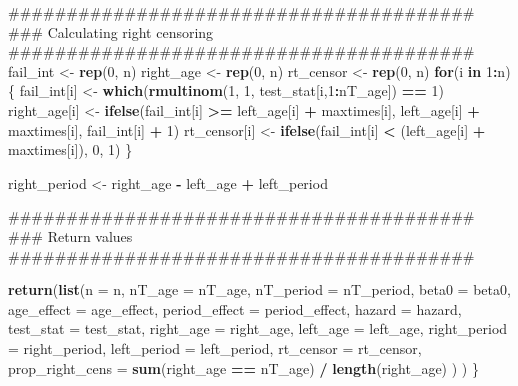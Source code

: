 \documentclass[11pt,]{article}
\newenvironment{Shaded}{\begin{snugshade}}{\end{snugshade}}
\newcommand{\KeywordTok}[1]{\textcolor[rgb]{0.13,0.29,0.53}{\textbf{#1}}}
\newcommand{\DataTypeTok}[1]{\textcolor[rgb]{0.13,0.29,0.53}{#1}}
\newcommand{\DecValTok}[1]{\textcolor[rgb]{0.00,0.00,0.81}{#1}}
\newcommand{\StringTok}[1]{\textcolor[rgb]{0.31,0.60,0.02}{#1}}
\newcommand{\ControlFlowTok}[1]{\textcolor[rgb]{0.13,0.29,0.53}{\textbf{#1}}}
\newcommand{\OperatorTok}[1]{\textcolor[rgb]{0.81,0.36,0.00}{\textbf{#1}}}
\newcommand{\NormalTok}[1]{#1}
\begin{document}
\begin{Shaded}
\begin{Highlighting}[]
\NormalTok{  ########################################}
\NormalTok{  ### Calculating right censoring}
\NormalTok{  ########################################}
\NormalTok{  fail_int <-}\StringTok{ }\KeywordTok{rep}\NormalTok{(}\DecValTok{0}\NormalTok{, n)}
\NormalTok{  right_age <-}\StringTok{ }\KeywordTok{rep}\NormalTok{(}\DecValTok{0}\NormalTok{, n)}
\NormalTok{  rt_censor <-}\StringTok{ }\KeywordTok{rep}\NormalTok{(}\DecValTok{0}\NormalTok{, n)}
  \ControlFlowTok{for}\NormalTok{(i }\ControlFlowTok{in} \DecValTok{1}\OperatorTok{:}\NormalTok{n) \{}
\NormalTok{    fail_int[i] <-}\StringTok{ }\KeywordTok{which}\NormalTok{(}\KeywordTok{rmultinom}\NormalTok{(}\DecValTok{1}\NormalTok{, }\DecValTok{1}\NormalTok{, test_stat[i,}\DecValTok{1}\OperatorTok{:}\NormalTok{nT_age]) }\OperatorTok{==}\StringTok{ }\DecValTok{1}\NormalTok{)}
\NormalTok{    right_age[i] <-}\StringTok{ }\KeywordTok{ifelse}\NormalTok{(fail_int[i] }\OperatorTok{>=}\StringTok{ }\NormalTok{left_age[i] }\OperatorTok{+}\StringTok{ }\NormalTok{maxtimes[i],}
\NormalTok{                           left_age[i] }\OperatorTok{+}\StringTok{ }\NormalTok{maxtimes[i], fail_int[i] }\OperatorTok{+}\StringTok{ }\DecValTok{1}\NormalTok{)}
\NormalTok{    rt_censor[i] <-}\StringTok{ }\KeywordTok{ifelse}\NormalTok{(fail_int[i] }\OperatorTok{<}\StringTok{ }\NormalTok{(left_age[i] }\OperatorTok{+}\StringTok{ }\NormalTok{maxtimes[i]), }\DecValTok{0}\NormalTok{, }\DecValTok{1}\NormalTok{)}
\NormalTok{  \}}

\NormalTok{  right_period <-}\StringTok{ }\NormalTok{right_age }\OperatorTok{-}\StringTok{ }\NormalTok{left_age }\OperatorTok{+}\StringTok{ }\NormalTok{left_period}

\NormalTok{  ########################################}
\NormalTok{  ### Return values}
\NormalTok{  ########################################}

  \KeywordTok{return}\NormalTok{(}\KeywordTok{list}\NormalTok{(}\DataTypeTok{n =}\NormalTok{ n,}
              \DataTypeTok{nT_age =}\NormalTok{ nT_age,}
              \DataTypeTok{nT_period =}\NormalTok{ nT_period,}
              \DataTypeTok{beta0 =}\NormalTok{ beta0,}
              \DataTypeTok{age_effect =}\NormalTok{ age_effect,}
              \DataTypeTok{period_effect =}\NormalTok{ period_effect,}
              \DataTypeTok{hazard =}\NormalTok{ hazard,}
              \DataTypeTok{test_stat =}\NormalTok{ test_stat,}
              \DataTypeTok{right_age =}\NormalTok{ right_age,}
              \DataTypeTok{left_age =}\NormalTok{ left_age,}
              \DataTypeTok{right_period =}\NormalTok{ right_period,}
              \DataTypeTok{left_period =}\NormalTok{ left_period,}
              \DataTypeTok{rt_censor =}\NormalTok{ rt_censor,}
              \DataTypeTok{prop_right_cens =} \KeywordTok{sum}\NormalTok{(right_age }\OperatorTok{==}\StringTok{ }\NormalTok{nT_age) }\OperatorTok{/}\StringTok{ }\KeywordTok{length}\NormalTok{(right_age)}
\NormalTok{              )}
\NormalTok{         )}
\NormalTok{\}}
\end{Highlighting}
\end{Shaded}
\end{document}
